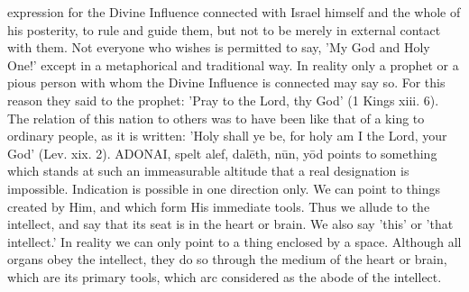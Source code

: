 \documentclass[12pt]{article}
\begin{document}
expression for the Divine Influence connected with Israel himself and the whole of his posterity, to rule and guide them, but not to be merely in external contact with them. Not everyone who wishes is permitted to say, 'My God and Holy One!' except in a metaphorical and traditional way. In reality only a prophet or a pious person with whom the Divine Influence is connected may say so. For this reason they said to the prophet: 'Pray to the Lord, thy God' (1 Kings xiii. 6). The relation of this nation to others was to have been like that of a king to ordinary people, as it is written: 'Holy shall ye be, for holy am I the Lord, your God' (Lev. xix. 2). ADONAI, spelt alef, dalēth, nūn, yōd points to something which stands at such an immeasurable altitude that a real designation is impossible. Indication is possible in one direction only. We can point to things created by Him, and which form His immediate tools. Thus we allude to the intellect, and say that its seat is in the heart or brain. We also say 'this' or 'that intellect.' In reality we can only point to a thing enclosed by a space. Although all organs obey the intellect, they do so through the medium of the heart or brain, which are its primary tools, which arc considered as the abode of the intellect.
\end{document}
